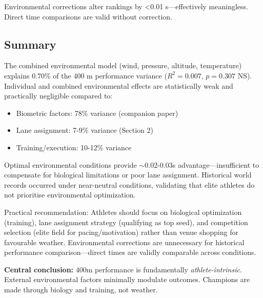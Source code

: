 Environmental corrections alter rankings by <0.01 s—effectively meaningless. Direct time comparisons are valid without correction.

\subsection{Summary}

The combined environmental model (wind, pressure, altitude, temperature) explains 0.70\% of the 400 m performance variance ($R^2 = 0.007$, $p = 0.307$ NS). Individual and combined environmental effects are statistically weak and practically negligible compared to:
\begin{itemize}
    \item Biometric factors: 78\% variance (companion paper)
    \item Lane assignment: 7-9\% variance (Section 2)
    \item Training/execution: 10-12\% variance
\end{itemize}

Optimal environmental conditions provide $\sim$0.02-0.03s advantage—insufficient to compensate for biological limitations or poor lane assignment. Historical world records occurred under near-neutral conditions, validating that elite athletes do not prioritise environmental optimization.

Practical recommendation: Athletes should focus on biological optimization (training), lane assignment strategy (qualifying as top seed), and competition selection (elite field for pacing/motivation) rather than venue shopping for favourable weather. Environmental corrections are unnecessary for historical performance comparison—direct times are validly comparable across conditions.

\textbf{Central conclusion:} 400m performance is fundamentally \textit{athlete-intrinsic}. External environmental factors minimally modulate outcomes. Champions are made through biology and training, not weather.
